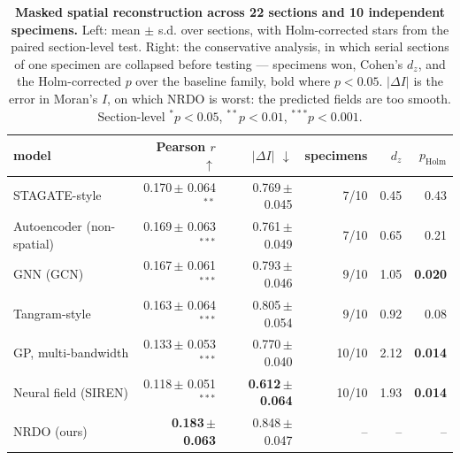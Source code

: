 \begin{table}[htbp]
\centering
\small
\caption{\textbf{Masked spatial reconstruction across 22 sections and 10 independent specimens.} Left: mean $\pm$ s.d. over sections, with Holm-corrected stars from the paired section-level test. Right: the conservative analysis, in which serial sections of one specimen are collapsed before testing --- specimens won, Cohen's $d_z$, and the Holm-corrected $p$ over the baseline family, bold where $p<0.05$. $|\Delta I|$ is the error in Moran's $I$, on which NRDO is worst: the predicted fields are too smooth. Section-level $^{*}p<0.05$, $^{**}p<0.01$, $^{***}p<0.001$.}
\label{tab:headline}
\begin{tabular}{lrrrrr}
\toprule
model & Pearson $r$ $\uparrow$ & $|\Delta I|$ $\downarrow$ & specimens & $d_z$ & $p_{\mathrm{Holm}}$\\
\midrule
STAGATE-style & 0.170\,\tiny{$\pm$ 0.064}$^{**}$ & 0.769\,\tiny{$\pm$ 0.045} & 7/10 & 0.45 & 0.43 \\
Autoencoder (non-spatial) & 0.169\,\tiny{$\pm$ 0.063}$^{***}$ & 0.761\,\tiny{$\pm$ 0.049} & 7/10 & 0.65 & 0.21 \\
GNN (GCN) & 0.167\,\tiny{$\pm$ 0.061}$^{***}$ & 0.793\,\tiny{$\pm$ 0.046} & 9/10 & 1.05 & \textbf{0.020} \\
Tangram-style & 0.163\,\tiny{$\pm$ 0.064}$^{***}$ & 0.805\,\tiny{$\pm$ 0.054} & 9/10 & 0.92 & 0.08 \\
GP, multi-bandwidth & 0.133\,\tiny{$\pm$ 0.053}$^{***}$ & 0.770\,\tiny{$\pm$ 0.040} & 10/10 & 2.12 & \textbf{0.014} \\
Neural field (SIREN) & 0.118\,\tiny{$\pm$ 0.051}$^{***}$ & \textbf{0.612\,\tiny{$\pm$ 0.064}} & 10/10 & 1.93 & \textbf{0.014} \\
\midrule
NRDO (ours) & \textbf{0.183\,\tiny{$\pm$ 0.063}} & 0.848\,\tiny{$\pm$ 0.047} & -- & -- & -- \\
\bottomrule
\end{tabular}
\end{table}

